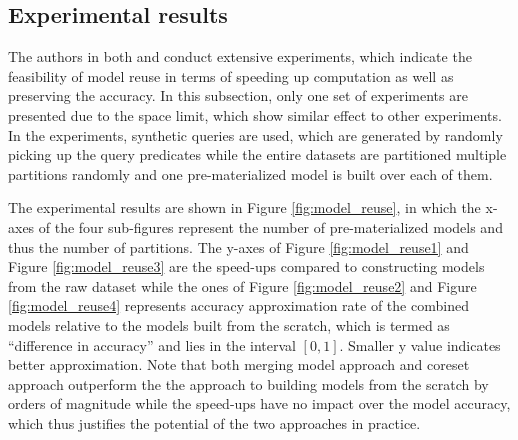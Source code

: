 \subsection{Experimental results}

The authors in both \cite{gupta2015processing} and \cite{hasani2018efficient} conduct extensive experiments, which indicate the feasibility of model reuse in terms of speeding up computation as well as preserving the accuracy. In this subsection, only one set of experiments are presented due to the space limit, which show similar effect to other experiments. In the experiments, synthetic queries are used, which are generated by randomly picking up the query predicates while the entire datasets are partitioned multiple partitions randomly and one pre-materialized model is built over each of them. 

The experimental results are shown in Figure \ref{fig:model_reuse}, in which the x-axes of the four sub-figures represent the number of pre-materialized models and thus the number of partitions. The y-axes of Figure \ref{fig:model_reuse1} and Figure \ref{fig:model_reuse3} are the speed-ups compared to constructing models from the raw dataset while the ones of Figure \ref{fig:model_reuse2} and Figure \ref{fig:model_reuse4} represents accuracy approximation rate of the combined models relative to the models built from the scratch, which is termed as ``difference in accuracy'' and lies in the interval $[0,1]$. Smaller y value indicates better approximation. Note that both merging model approach and coreset approach outperform the the approach to building models from the scratch by orders of magnitude while the speed-ups have no impact over the model accuracy, which thus justifies the potential of the two approaches in practice.

